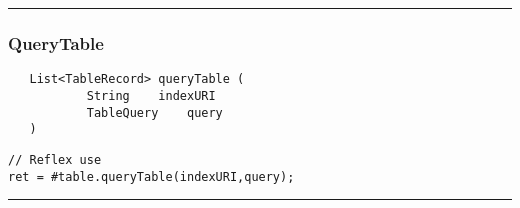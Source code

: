 \rule{15cm}{2pt}
\subsubsection{QueryTable}
\label{Api:QueryTable}
\begin{verbatim}
   List<TableRecord> queryTable (
           String    indexURI
           TableQuery    query
   )
\end{verbatim}
\begin{lstlisting}[language=reflex]
// Reflex use
ret = #table.queryTable(indexURI,query);
\end{lstlisting}



\rule{15cm}{2pt}
